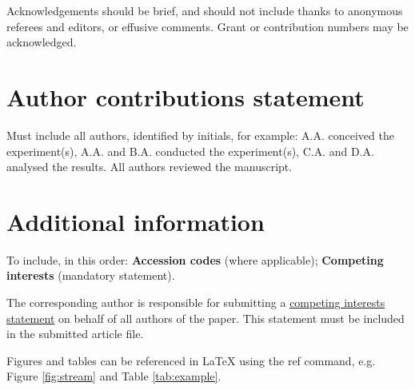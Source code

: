 \documentclass[fleqn,10pt]{wlscirep}
\begin{document}
Acknowledgements should be brief, and should not include thanks to anonymous referees and editors, or effusive comments. Grant or contribution numbers may be acknowledged.

\section*{Author contributions statement}

Must include all authors, identified by initials, for example:
A.A. conceived the experiment(s),  A.A. and B.A. conducted the experiment(s), C.A. and D.A. analysed the results.  All authors reviewed the manuscript. 

\section*{Additional information}

To include, in this order: \textbf{Accession codes} (where applicable); \textbf{Competing interests} (mandatory statement). 

The corresponding author is responsible for submitting a \href{http://www.nature.com/srep/policies/index.html#competing}{competing interests statement} on behalf of all authors of the paper. This statement must be included in the submitted article file.





Figures and tables can be referenced in LaTeX using the ref command, e.g. Figure \ref{fig:stream} and Table \ref{tab:example}.
\end{document}
